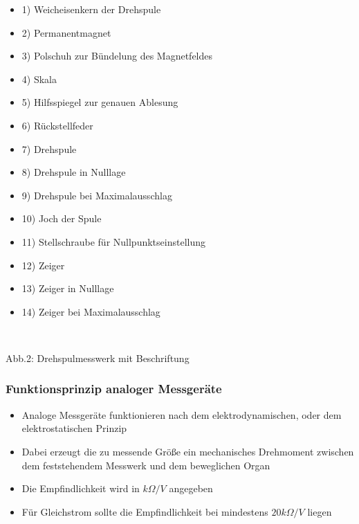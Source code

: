\begin{frame}
\begin{minipage}{0.4\textwidth}
	\begin{itemize} \tiny
		\item \tiny 1) Weicheisenkern der Drehspule
		\item 2) Permanentmagnet
		\item 3) Polschuh zur Bündelung des Magnetfeldes
		\item 4) Skala
		\item 5) Hilfsspiegel zur genauen Ablesung
		\item 6) Rückstellfeder
		\item 7) Drehspule
		\item 8) Drehspule in Nulllage
		\item 9) Drehspule bei Maximalausschlag
		\item 10) Joch der Spule
		\item 11) Stellschraube für Nullpunktseinstellung
		\item 12) Zeiger
		\item 13) Zeiger in Nulllage
		\item 14) Zeiger bei Maximalausschlag
	\end{itemize}
	\end{minipage}\\
	\begin{small}	
		Abb.2: Drehspulmesswerk mit Beschriftung \cite{wmen}
	\end{small}
\end{frame}

\begin{frame}
	\frametitle{Funktionsprinzip analoger Messgeräte}
	\begin{itemize}
		\item	Analoge Messgeräte funktionieren nach dem elektrodynamischen, oder dem elektrostatischen Prinzip
		\item	Dabei erzeugt die zu messende Größe ein mechanisches Drehmoment zwischen dem feststehendem Messwerk und dem beweglichen Organ
		\item	Die Empfindlichkeit wird in $k \Omega /V$ angegeben
		\item	Für Gleichstrom sollte die Empfindlichkeit bei mindestens $20 k \Omega / V$ liegen
	\end{itemize}
\end{frame}

